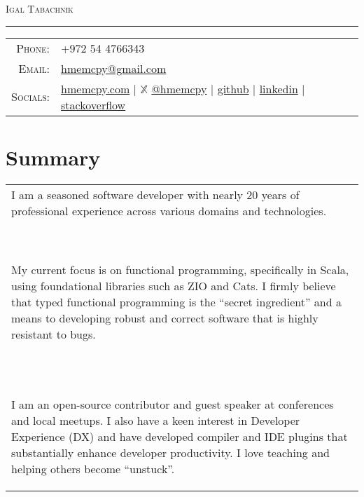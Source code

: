 \documentclass[a4paper,11pt]{article}
\begin{document}
\par{\centering
		{\Huge \textsc{Igal Tabachnik}
	}\bigskip\par}

\hrule
\vspace{0.5em}
\begin{tabular}{rl}
  \textsc{Phone:}     & +972 54 4766343\\
  \textsc{Email:}     & \href{mailto:hmemcpy@gmail.com}{hmemcpy@gmail.com}\\
  \textsc{Socials:}   & \faHome{} \href{https://hmemcpy.com}{hmemcpy.com} 
                      | $\mathbb{X}$ \href{https://twitter.com/hmemcpy}{@hmemcpy}
                      | \faGithub{} \href{https://github.com/hmemcpy}{github}
                      | \faLinkedin{} \href{https://www.linkedin.com/in/igaltabachnik/}{linkedin}
                      | \faStackOverflow{} \href{https://stackoverflow.com/users/8205/igal-tabachnik}{stackoverflow}
\end{tabular}

\section{Summary}
\begin{tabular}{p{}}
 I am a seasoned software developer with nearly 20 years of professional experience across various domains and technologies.\\\
 
 My current focus is on functional programming, specifically in Scala, using foundational libraries such as ZIO and Cats. I firmly believe that typed functional programming is the ``secret ingredient'' and a means to developing robust and correct software that is highly resistant to bugs.\\\

 I am an open-source contributor and guest speaker at conferences and local meetups. I also have a keen interest in Developer Experience (DX) and have developed compiler and IDE plugins that substantially enhance developer productivity. I love teaching and helping others become ``unstuck''.
\end{tabular}
\end{document}
